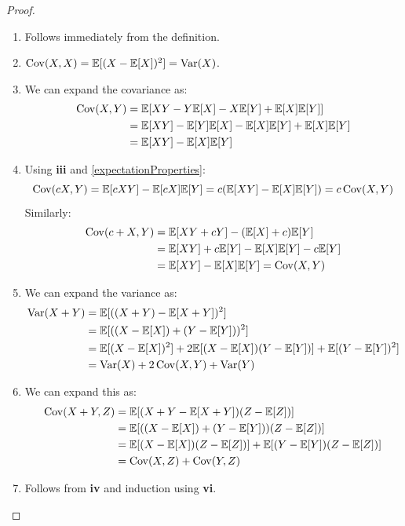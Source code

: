 \documentclass[../main.tex]{subfiles}
\begin{document}
\begin{proof}
  \begin{enumerate}
    \item Follows immediately from the definition.
    \item $\operatorname{Cov}(X, X) = \mathbb{E}[(X - \mathbb{E}[X])^2] = \operatorname{Var}(X)$.
    \item We can expand the covariance as:
      \begin{align*}
        \operatorname{Cov}(X, Y) &= \mathbb{E}[XY - Y\mathbb{E}[X] - X\mathbb{E}[Y] + \mathbb{E}[X]\mathbb{E}[Y]] \\
                   &= \mathbb{E}[XY] - \mathbb{E}[Y]\mathbb{E}[X] - \mathbb{E}[X]\mathbb{E}[Y] + \mathbb{E}[X]\mathbb{E}[Y] \\
                   &= \mathbb{E}[XY] - \mathbb{E}[X]\mathbb{E}[Y]
      \end{align*}
    \item Using \textbf{iii} and \cref{expectationProperties}:
      \[
        \operatorname{Cov}(cX, Y) = \mathbb{E}[cXY] - \mathbb{E}[cX]\mathbb{E}[Y] = c(\mathbb{E}[XY] - \mathbb{E}[X]\mathbb{E}[Y]) = c\operatorname{Cov}(X, Y)
      \]
      Similarly:
      \begin{align*}
        \operatorname{Cov}(c + X, Y) &= \mathbb{E}[XY + cY] - (\mathbb{E}[X] + c)\mathbb{E}[Y] \\
                       &= \mathbb{E}[XY] + c\mathbb{E}[Y] - \mathbb{E}[X]\mathbb{E}[Y] - c\mathbb{E}[Y] \\
                       &= \mathbb{E}[XY] - \mathbb{E}[X]\mathbb{E}[Y] = \operatorname{Cov}(X, Y)
      \end{align*}
    \item We can expand the variance as:
      \begin{align*}
        \operatorname{Var}(X + Y) &= \mathbb{E}[((X + Y) - \mathbb{E}[X + Y])^2] \\
                    &= \mathbb{E}[((X - \mathbb{E}[X]) + (Y - \mathbb{E}[Y]))^2] \\
                    &= \mathbb{E}[(X - \mathbb{E}[X])^2] + 2\mathbb{E}[(X - \mathbb{E}[X])(Y - \mathbb{E}[Y])] + \mathbb{E}[(Y - \mathbb{E}[Y])^2] \\
                    &= \operatorname{Var}(X) + 2\operatorname{Cov}(X, Y) + \operatorname{Var}(Y)
      \end{align*}
    \item We can expand this as:
      \begin{align*}
        \operatorname{Cov}(X + Y, Z) &= \mathbb{E}[(X + Y - \mathbb{E}[X + Y])(Z - \mathbb{E}[Z])] \\
                       &= \mathbb{E}[((X - \mathbb{E}[X]) + (Y - \mathbb{E}[Y]))(Z - \mathbb{E}[Z])] \\
                       &= \mathbb{E}[(X - \mathbb{E}[X])(Z - \mathbb{E}[Z])] + \mathbb{E}[(Y - \mathbb{E}[Y])(Z - \mathbb{E}[Z])] \\
                       &= \operatorname{Cov}(X, Z) + \operatorname{Cov}(Y, Z)
      \end{align*}
    \item Follows from \textbf{iv} and induction using \textbf{vi}.

\end{enumerate}
\end{proof}
\end{document}

